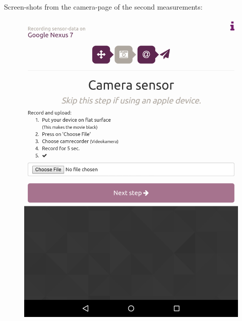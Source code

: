 Screen-shots from the camera-page of the second measurements:
\begin{figure}[h!]
  \hspace{-2cm}
  \centering
  \begin{minipage}[c]{.23\textwidth}
    \centering
    \includegraphics[scale=0.15]{img/sensorrec-nexus-3-cam}
  \end{minipage}
  \hspace{2cm}
  \begin{minipage}[c]{.23\textwidth}
    \centering

\end{minipage}
\end{figure}
